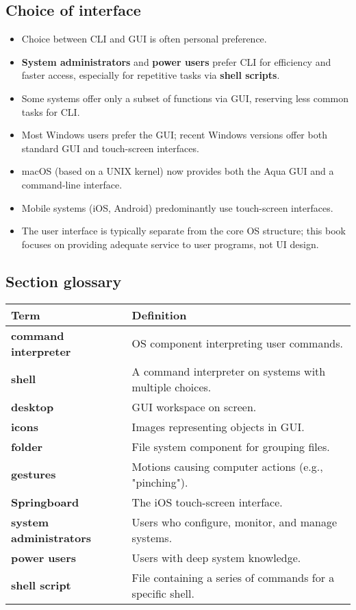 \subsection*{Choice of interface}
\begin{itemize}
    \item Choice between CLI and GUI is often personal preference.
    \item \textbf{System administrators} and \textbf{power users} prefer CLI for efficiency and faster access, especially for repetitive tasks via \textbf{shell scripts}.
    \item Some systems offer only a subset of functions via GUI, reserving less common tasks for CLI.
    \item Most Windows users prefer the GUI; recent Windows versions offer both standard GUI and touch-screen interfaces.
    \item macOS (based on a UNIX kernel) now provides both the Aqua GUI and a command-line interface.
    \item Mobile systems (iOS, Android) predominantly use touch-screen interfaces.
    \item The user interface is typically separate from the core OS structure; this book focuses on providing adequate service to user programs, not UI design.
\end{itemize}

\subsection*{Section glossary}
\centering
\begin{tabular}{>{\raggedright}p{} >{\raggedright\arraybackslash}p{}}
\toprule
\textbf{Term} & \textbf{Definition} \\
\midrule
\textbf{command interpreter} & OS component interpreting user commands. \\
\textbf{shell} & A command interpreter on systems with multiple choices. \\
\textbf{desktop} & GUI workspace on screen. \\
\textbf{icons} & Images representing objects in GUI. \\
\textbf{folder} & File system component for grouping files. \\
\textbf{gestures} & Motions causing computer actions (e.g., "pinching"). \\
\textbf{Springboard} & The iOS touch-screen interface. \\
\textbf{system administrators} & Users who configure, monitor, and manage systems. \\
\textbf{power users} & Users with deep system knowledge. \\
\textbf{shell script} & File containing a series of commands for a specific shell. \\
\bottomrule
\end{tabular}
\vspace{\baselineskip}
